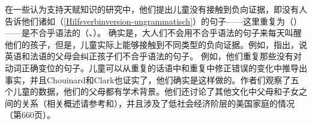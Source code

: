 在一些认为支持天赋知识的研究中，他们提出儿童没有接触到负向证据，即没有人告诉他们诸如（\ref{Hilfsverbinversion-ungrammatisch}）的句子——这里重复为（）——是不合乎语法的（\citealp[--52]{BH70a}、\citealp{Marcus93a}）。
\z
确实是，大人们不会用不合乎语法的句子来每天叫醒他们的孩子，但是，儿童实际上能够接触到不同类型的负向证据。例如，\citet{CC2003a}指出，说英语和法语的父母会纠正孩子们不合乎语法的句子。
例如，他们重复那些没有对动词正确变位的句子。儿童可以从重复的话语中和重复中修正错误的变化中推导出事实，并且Chouinard和Clark也证实了，他们确实是这样做的。作者们观察了五个儿童的数据，他们的父母都有学术背景。他们还讨论了其他文化中父母和子女之间的关系（相关概述请参考和），并且涉及了低社会经济阶层的美国家庭的情况（第660页）。

